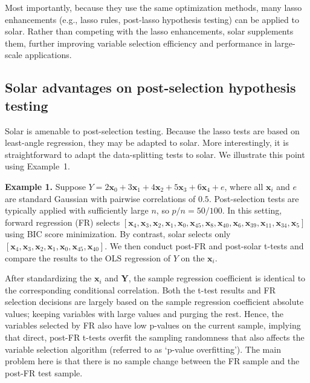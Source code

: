 \documentclass[11pt,authoryear]{elsarticle}
\begin{document}
Most importantly, because they use the same optimization methods, many lasso enhancements (e.g., lasso rules, post-lasso hypothesis testing) can be applied to solar. Rather than competing with the lasso enhancements, solar supplements them, further improving variable selection efficiency and performance in large-scale applications.

\subsection{Solar advantages on post-selection hypothesis testing}

Solar is amenable to post-selection testing. Because the lasso tests \citep{lockhartall14, taylor2014exact} are based on least-angle regression, they may be adapted to solar. More interestingly, it is straightforward to adapt the data-splitting tests \citep{wasserman2009high,meinshausen2009p} to solar. We illustrate this point using Example~1.

\smallskip
\noindent
\textbf{Example 1.} Suppose $Y = 2 \mathbf{x}_0 + 3 \mathbf{x}_1 + 4 \mathbf{x}_2 + 5 \mathbf{x}_3 + 6 \mathbf{x}_4  + e$, where all $\mathbf{x}_i$ and $e$ are standard Gaussian with pairwise correlations of $0.5$. Post-selection tests are typically applied with sufficiently large $n$, so $p/n=50/100$. In this setting, forward regression (FR) selects $\left[\mathbf{x}_4, \mathbf{x}_3, \mathbf{x}_2, \mathbf{x}_1, \mathbf{x}_0, \mathbf{x}_{45}, \mathbf{x}_{8}, \mathbf{x}_{40}, \mathbf{x}_{6}, \mathbf{x}_{39}, \mathbf{x}_{11}, \mathbf{x}_{34}, \mathbf{x}_{5} \right]$ using BIC score minimization. By contrast, solar selects only $\left[\mathbf{x}_4, \mathbf{x}_3, \mathbf{x}_2, \mathbf{x}_1, \mathbf{x}_0, \mathbf{x}_{45}, \mathbf{x}_{40} \right]$. We then conduct post-FR and post-solar t-tests and compare the results to the OLS regression of $Y$ on the $\mathbf{x}_i$.

After standardizing the $\mathbf{x}_i$ and $\mathbf{Y}$, the sample regression coefficient is identical to the corresponding conditional correlation. Both the t-test results and FR selection decisions are largely based on the sample regression coefficient absolute values; keeping variables with large values and purging the rest. Hence, the variables selected by FR also have low p-values on the current sample, implying that direct, post-FR t-tests overfit the sampling randomness that also affects the variable selection algorithm (referred to as `p-value overfitting'). The main problem here is that there is no sample change between the FR sample and the post-FR test sample.
\end{document}
